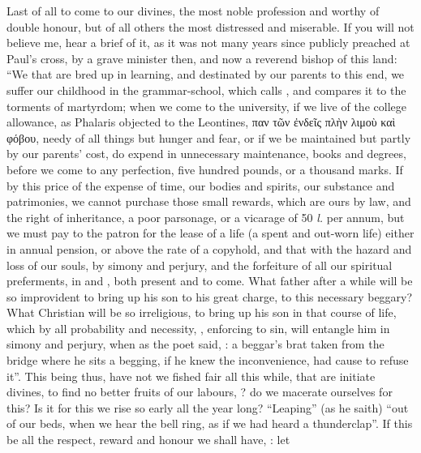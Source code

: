 Last of all to come to our divines, the most noble profession and worthy of
double honour, but of all others the most distressed and miserable. If you will
not believe me, hear a brief of it, as it was not many years since publicly
preached at Paul's cross, by a grave minister then, and
now a reverend bishop of this land: \enquote{We that are bred up in learning, and
destinated by our parents to this end, we suffer our childhood in the
grammar-school, which \Austin{} calls , and
compares it to the torments of martyrdom; when we come to the university, if we
live of the college allowance, as Phalaris objected to the Leontines,
\textgreek{παν τῶν ἐνδεῖς πλὴν λιμοὺ καὶ φόβου}, needy of all things but hunger
and fear, or if we be maintained but partly by our parents' cost, do expend in
unnecessary maintenance, books and degrees, before we come to any perfection,
five hundred pounds, or a thousand marks. If by this price of the expense of
time, our bodies and spirits, our substance and patrimonies, we cannot purchase
those small rewards, which are ours by law, and the right of inheritance, a
poor parsonage, or a vicarage of 50 \emph{l.} per annum, but we must pay to the
patron for the lease of a life (a spent and out-worn life) either in annual
pension, or above the rate of a copyhold, and that with the hazard and loss of
our souls, by simony and perjury, and the forfeiture of all our spiritual
preferments, in  and , both present and to come. What father
after a while will be so improvident to bring up his son to his great charge,
to this necessary beggary? What Christian will be so irreligious, to bring up
his son in that course of life, which by all probability and necessity,
, enforcing to sin, will entangle him in simony and
perjury, when as the poet said, : a beggar's brat taken from the bridge where he sits a begging, if he
knew the inconvenience, had cause to refuse it}. This being thus, have not we
fished fair all this while, that are initiate divines, to find no better fruits
of our labours, ? do we macerate ourselves for this? Is it for this we rise so
early all the year long? \enquote{Leaping} (as he saith) \enquote{out of
our beds, when we hear the bell ring, as if we had heard a thunderclap}. If
this be all the respect, reward and honour we shall have,
: let
